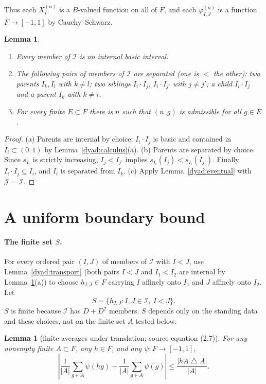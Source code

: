 \documentclass[11pt]{article}
\newcommand{\cI}{\mathcal I}
\newtheorem{lemma}[theorem]{Lemma}
\theoremstyle{definition}
\numberwithin{equation}{section}
\begin{document}
Thus each \(X_I^{(n)}\) is a \(B\)-valued function on all of \(F\), and
each \(\varphi_{I,J}^{(n)}\) is a function \(F\to[-1,1]\) by
Cauchy--Schwarz.

\begin{lemma}\label{color:family}
\begin{enumerate}[label=(\alph*)]
\item Every member of \(\cI\) is an internal basic interval.
\item The following pairs of members of \(\cI\) are separated (one is
\(<\) the other): two parents \(I_k,I_l\) with \(k\ne l\); two siblings
\(I_i\cdot I_j,\ I_i\cdot I_{j'}\) with \(j\ne j'\); a child
\(I_i\cdot I_j\) and a parent \(I_k\) with \(k\ne i\).
\item For every finite \(E\subset F\) there is \(n\) such that \((n,g)\)
is admissible for all \(g\in E\).
\end{enumerate}
\end{lemma}

\begin{proof}
(a) Parents are internal by choice; \(I_i\cdot I_j\) is basic and
contained in \(I_i\subset(0,1)\) by Lemma~\ref{dyad:calculus}(a).
(b) Parents are separated by choice. Since \(s_{I_i}\) is strictly
increasing, \(I_j<I_{j'}\) implies
\(s_{I_i}(I_j)<s_{I_i}(I_{j'})\). Finally \(I_i\cdot I_j\subseteq I_i\),
and \(I_i\) is separated from \(I_k\). (c) Apply
Lemma~\ref{dyad:eventual} with \(\mathcal J=\cI\).
\end{proof}

\section{A uniform boundary bound}\label{sec:boundary}

\paragraph{The finite set \(S\).} For every ordered pair \((I,J)\) of
members of \(\cI\) with \(I<J\), use Lemma~\ref{dyad:transport} (both
pairs \(I<J\) and \(I_1<I_2\) are internal by
Lemma~\ref{color:family}(a)) to choose \(h_{I,J}\in F\) carrying \(I\)
affinely onto \(I_1\) and \(J\) affinely onto \(I_2\). Let
\[
  S=\{h_{I,J}:I,J\in\cI,\ I<J\}.
\]
\(S\) is finite because \(\cI\) has \(D+D^2\) members. \(S\) depends only
on the standing data and these choices, not on the finite set \(A\)
tested below.

\begin{lemma}[finite averages under translation; source equation (2.7)]
\label{lem:finite-translation}
For any nonempty finite \(A\subset F\), any \(h\in F\), and any
\(\psi:F\to[-1,1]\),
\begin{equation}\label{eq:finite-translation}
 \left|\frac1{|A|}\sum_{g\in A}\psi(hg)
       -\frac1{|A|}\sum_{g\in A}\psi(g)\right|
 \le\frac{|hA\mathbin{\triangle}A|}{|A|}.
\end{equation}
\end{lemma}
\end{document}
